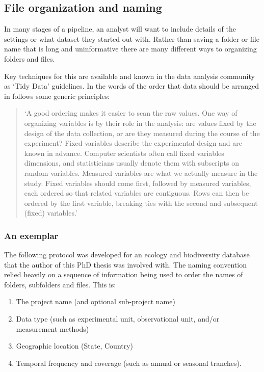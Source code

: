 \documentclass[11pt,a4paper]{article}
\begin{document}
\subsection{File organization and
naming}\label{file-organization-and-naming}

In many stages of a pipeline, an analyst will want to include details of
the settings or what dataset they started out with. Rather than saving a
folder or file name that is long and uninformative there are many
different ways to organizing folders and files.

Key techniques for this are available and known in the data analysis
community as `Tidy Data' guidelines. In the words of \citet{WickhamRstudio2014} the
order that data should be arranged in follows some generic principles:

\begin{quote}
`A good ordering makes it easier to scan the raw values. One way of
organizing variables is by their role in the analysis: are values
fixed by the design of the data collection, or are they measured
during the course of the experiment? Fixed variables describe the
experimental design and are known in advance. Computer scientists
often call fixed variables dimensions, and statisticians usually
denote them with subscripts on random variables. Measured variables
are what we actually measure in the study. Fixed variables should come
first, followed by measured variables, each ordered so that related
variables are contiguous. Rows can then be ordered by the first
variable, breaking ties with the second and subsequent (fixed)
variables.'
\end{quote}

\subsubsection{An exemplar}\label{an-exemplar}

The following protocol was developed for an ecology and biodiversity
database that the author of this PhD thesis was involved with. The
naming convention relied heavily on a sequence of information being used
to order the names of folders, subfolders and files. This is:

\begin{enumerate}
\def\labelenumi{\arabic{enumi}.}
\itemsep1pt\parskip0pt
\item
  The project name (and optional sub-project name)
\item
  Data type (such as experimental unit, observational unit, and/or
  measurement methods)
\item
  Geographic location (State, Country)
\item
  Temporal frequency and coverage (such as annual or seasonal tranches).
\end{enumerate}
\end{document}
